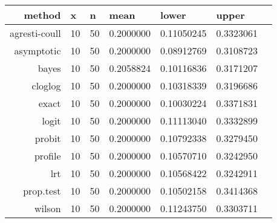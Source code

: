 \documentclass[11pt]{article}
\begin{document}
    
    \begin{tabular}{r|llllll}
 method & x & n & mean & lower & upper\\
\hline
	 agresti-coull & 10            & 50            & 0.2000000     & 0.11050245    & 0.3323061    \\
	 asymptotic    & 10            & 50            & 0.2000000     & 0.08912769    & 0.3108723    \\
	 bayes         & 10            & 50            & 0.2058824     & 0.10116836    & 0.3171207    \\
	 cloglog       & 10            & 50            & 0.2000000     & 0.10318339    & 0.3196686    \\
	 exact         & 10            & 50            & 0.2000000     & 0.10030224    & 0.3371831    \\
	 logit         & 10            & 50            & 0.2000000     & 0.11113040    & 0.3332899    \\
	 probit        & 10            & 50            & 0.2000000     & 0.10792338    & 0.3279450    \\
	 profile       & 10            & 50            & 0.2000000     & 0.10570710    & 0.3242950    \\
	 lrt           & 10            & 50            & 0.2000000     & 0.10568422    & 0.3242911    \\
	 prop.test     & 10            & 50            & 0.2000000     & 0.10502158    & 0.3414368    \\
	 wilson        & 10            & 50            & 0.2000000     & 0.11243750    & 0.3303711    \\
\end{tabular}
\end{document}
